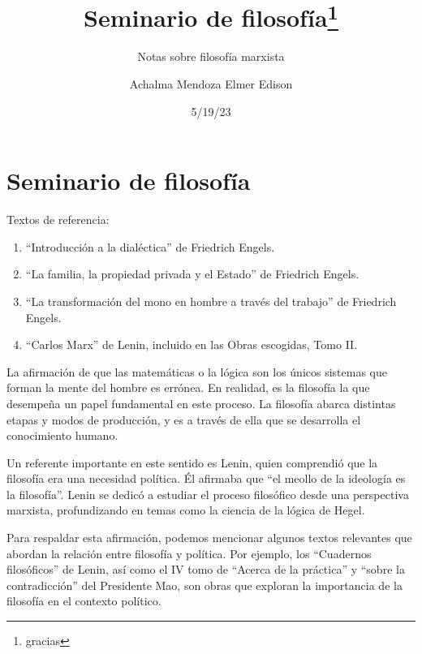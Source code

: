\documentclass[
  a4paper,
]{article}
\title{Seminario de filosofía\thanks{gracias}}
\subtitle{Notas sobre filosofía marxista}
\author{Achalma Mendoza Elmer Edison}
\date{5/19/23}
\renewcommand*\contentsname{Table of contents}
\newcommand\contentsname{Table of contents}
\begin{document}
\maketitle
\ifdefined\Shaded\renewenvironment{Shaded}{\begin{tcolorbox}[frame hidden, sharp corners, borderline west={3pt}{0pt}{shadecolor}, interior hidden, breakable, boxrule=0pt, enhanced]}{\end{tcolorbox}}\fi

\renewcommand*\contentsname{Contenidos}
{
\hypersetup{linkcolor=}
\setcounter{tocdepth}{3}
\tableofcontents
}
\listoffigures
\listoftables
\hypertarget{seminario-de-filosofuxeda}{%
\section{Seminario de filosofía}\label{seminario-de-filosofuxeda}}

Textos de referencia:

\begin{enumerate}
\def\labelenumi{\arabic{enumi}.}
\item
  ``Introducción a la dialéctica'' de Friedrich Engels.
\item
  ``La familia, la propiedad privada y el Estado'' de Friedrich Engels.
\item
  ``La transformación del mono en hombre a través del trabajo'' de
  Friedrich Engels.
\item
  ``Carlos Marx'' de Lenin, incluido en las Obras escogidas, Tomo II.
\end{enumerate}

La afirmación de que las matemáticas o la lógica son los únicos sistemas
que forman la mente del hombre es errónea. En realidad, es la filosofía
la que desempeña un papel fundamental en este proceso. La filosofía
abarca distintas etapas y modos de producción, y es a través de ella que
se desarrolla el conocimiento humano.

Un referente importante en este sentido es Lenin, quien comprendió que
la filosofía era una necesidad política. Él afirmaba que ``el meollo de
la ideología es la filosofía''. Lenin se dedicó a estudiar el proceso
filosófico desde una perspectiva marxista, profundizando en temas como
la ciencia de la lógica de Hegel.

Para respaldar esta afirmación, podemos mencionar algunos textos
relevantes que abordan la relación entre filosofía y política. Por
ejemplo, los ``Cuadernos filosóficos'' de Lenin, así como el IV tomo de
``Acerca de la práctica'' y ``sobre la contradicción'' del Presidente
Mao, son obras que exploran la importancia de la filosofía en el
contexto político.
\end{document}
